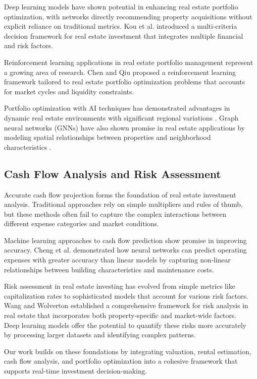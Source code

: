 \documentclass[conference]{IEEEtran}
\begin{document}
Deep learning models have shown potential in enhancing real estate portfolio optimization, with networks directly recommending property acquisitions without explicit reliance on traditional metrics. Kou et al. \cite{kou2014multiple} introduced a multi-criteria decision framework for real estate investment that integrates multiple financial and risk factors.

Reinforcement learning applications in real estate portfolio management represent a growing area of research. Chen and Qiu \cite{chen2017application} proposed a reinforcement learning framework tailored to real estate portfolio optimization problems that accounts for market cycles and liquidity constraints.

Portfolio optimization with AI techniques has demonstrated advantages in dynamic real estate environments with significant regional variations \cite{du2019machine}. Graph neural networks (GNNs) have also shown promise in real estate applications by modeling spatial relationships between properties and neighborhood characteristics \cite{yao2018deep}.

\subsection{Cash Flow Analysis and Risk Assessment}
Accurate cash flow projection forms the foundation of real estate investment analysis. Traditional approaches rely on simple multipliers and rules of thumb, but these methods often fail to capture the complex interactions between different expense categories and market conditions.

Machine learning approaches to cash flow prediction show promise in improving accuracy. Cheng et al. \cite{cheng2019big} demonstrated how neural networks can predict operating expenses with greater accuracy than linear models by capturing non-linear relationships between building characteristics and maintenance costs.

Risk assessment in real estate investing has evolved from simple metrics like capitalization rates to sophisticated models that account for various risk factors. Wang and Wolverton \cite{wang2002real} established a comprehensive framework for risk analysis in real estate that incorporates both property-specific and market-wide factors. Deep learning models offer the potential to quantify these risks more accurately by processing larger datasets and identifying complex patterns.

Our work builds on these foundations by integrating valuation, rental estimation, cash flow analysis, and portfolio optimization into a cohesive framework that supports real-time investment decision-making.
\end{document}
